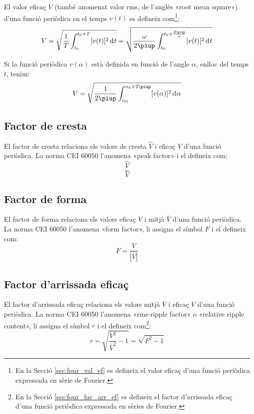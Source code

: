 El valor eficaç  $V$ (també anomenat valor rms, de l'anglès «root
mean square») d'una funció periòdica en el temps $v(t)$ es defineix com\footnote{En la Secció \ref{sec:four_val_ef} es defineix el valor eficaç d'una funció periòdica expressada en sèrie de Fourier.}:
\begin{equation}
    V = \sqrt{\frac{1}{T} \int_{t_0}^{t_0+T} [v(t)]^2 \diff
    t} = \sqrt{\frac{\omega}{2\piup} \int_{t_0}^{t_0+\frac{2\piup}{\omega}}
     [v(t)]^2 \diff t}
\end{equation}

Si la funció periòdica $v(\alpha)$ està definida en funció de
l'angle $\alpha$, enlloc del temps $t$, tenim:
\begin{equation}
    V = \sqrt{\frac{1}{2\piup} \int_{\alpha_0}^{\alpha_0+2\piup}
     [v(\alpha)]^2 \diff \alpha}
\end{equation}

\subsection{Factor de cresta}

El factor de cresta relaciona els valors de cresta $\hat{V}$
  i eficaç $V$ d'una funció periòdica. La norma CEI 60050 l'anomena «peak factor» i el defineix com:
\begin{equation}
     \frac{\hat{V}}{V}
\end{equation}

\subsection{Factor de forma}

El factor de forma relaciona els valors eficaç $V$
i mitjà $\bar{V}$ d'una funció periòdica. La norma CEI 60050 l'anomena «form factor», li assigna el símbol $F$ i el defineix com:
\begin{equation}
    F = \frac{V}{|\bar{V}|}
\end{equation}

\subsection{Factor d'arrissada eficaç}

El factor d'arrissada eficaç relaciona els
valors mitjà $\bar{V}$ i eficaç $V$ d'una funció periòdica.
La norma CEI 60050 l'anomena «rms-ripple factor» o «relative ripple content», li assigna el símbol $r$ i el defineix com\footnote{En la Secció \ref{sec:four_fac_arr_ef} es defineix el factor d'arrissada eficaç d'una funció periòdica expressada en sèries de Fourier.}:
\begin{equation}
    r = \sqrt{\frac{V^2}{\bar{V}^2}-1} = \sqrt{F^2-1}\label{eq:rms_rip}
\end{equation}

